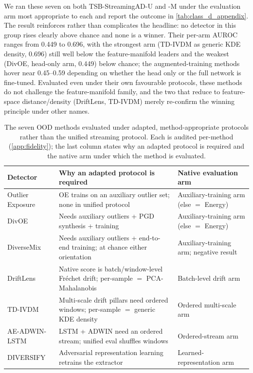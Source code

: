 We ran these seven on both TSB-StreamingAD-U and -M under the evaluation arm most
appropriate to each and report the outcome in \cref{tab:class_d_appendix}. The result
reinforces rather than complicates the headline: no detector in this group rises
clearly above chance and none is a winner. Their per-arm AUROC ranges from \num{0.449}
to \num{0.696}, with the strongest arm (TD-IVDM as generic KDE density, \num{0.696})
still well below the feature-manifold leaders and the weakest (DivOE, head-only arm,
\num{0.449}) below chance; the augmented-training methods hover near
\num{0.45}--\num{0.59} depending on whether the head only or the full network is
fine-tuned. Evaluated even under their own favourable protocols, these methods do not
challenge the feature-manifold family, and the two that reduce to feature-space
distance/density (DriftLens, TD-IVDM) merely re-confirm the winning principle under
other names.



\begin{table}[t]
\centering
\caption{The seven OOD methods evaluated under adapted, method-appropriate protocols
rather than the unified streaming protocol. Each is audited per-method
(\cref{app:fidelity}); the last column states why an adapted protocol is required and
the native arm under which the method is evaluated.}
\label{tab:classd}
\small
\begin{tabular}{l p{6.6cm} p{4.1cm}}
\toprule
Detector & Why an adapted protocol is required & Native evaluation arm \\
\midrule
Outlier Exposure & OE trains on an auxiliary outlier set; none in unified protocol & Auxiliary-training arm (else $=$ Energy) \\
DivOE & Needs auxiliary outliers + PGD synthesis + training & Auxiliary-training arm (else $=$ Energy) \\
DiverseMix & Needs auxiliary outliers + end-to-end training; at chance either orientation & Auxiliary-training arm; negative result \\
DriftLens & Native score is batch/window-level Fr\'echet drift; per-sample $=$ PCA-Mahalanobis & Batch-level drift arm \\
TD-IVDM & Multi-scale drift pillars need ordered windows; per-sample $=$ generic KDE density & Ordered multi-scale arm \\
AE-ADWIN-LSTM & LSTM + ADWIN need an ordered stream; unified eval shuffles windows & Ordered-stream arm \\
DIVERSIFY & Adversarial representation learning retrains the extractor & Learned-representation arm \\
\bottomrule
\end{tabular}
\end{table}
